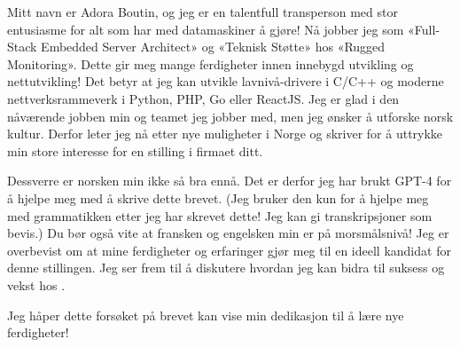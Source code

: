 \documentclass[a4paper,12pt]{article}
\begin{document}

\begin{coverletter}
    Mitt navn er Adora Boutin, og jeg er en talentfull transperson med stor entusiasme for alt som har med datamaskiner å gjøre! 
    Nå jobber jeg som «Full-Stack Embedded Server Architect» og «Teknisk Støtte» hos «Rugged Monitoring».
    Dette gir meg mange ferdigheter innen innebygd utvikling og nettutvikling! Det betyr at jeg kan utvikle lavnivå-drivere i C/C++ og moderne nettverksrammeverk i Python, PHP, Go eller ReactJS.
    Jeg er glad i den nåværende jobben min og teamet jeg jobber med, men jeg ønsker å utforske norsk kultur.
    Derfor leter jeg nå etter nye muligheter i Norge og skriver for å uttrykke min store interesse for en stilling i firmaet ditt.\newline

    Dessverre er norsken min ikke så bra ennå.
    Det er derfor jeg har brukt GPT-4 for å hjelpe meg med å skrive dette brevet.
    (Jeg bruker den kun for å hjelpe meg med grammatikken etter jeg har skrevet dette! Jeg kan gi transkripsjoner som bevis.) Du bør også vite at fransken og engelsken min er på morsmålsnivå! Jeg er overbevist om at mine ferdigheter og erfaringer gjør meg til en ideell kandidat for denne stillingen.
    Jeg ser frem til å diskutere hvordan jeg kan bidra til suksess og vekst hos \CompanyName.\newline

    Jeg håper dette forsøket på brevet kan vise min dedikasjon til å lære nye ferdigheter!
\end{coverletter}
\end{document}
